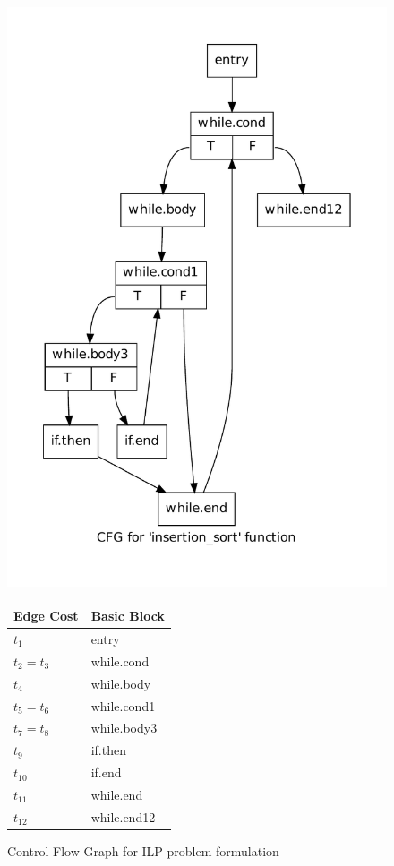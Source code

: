 \documentclass[12pt,a4paper,titlepage,oneside]{article}
\begin{document}
\begin{itemize}
\begin{figure}
\centering
\begin{minipage}[c]{.6\linewidth}
\centering
\includegraphics[width=0.90\linewidth]{../assignment/cfg_insertion_sort}
\end{minipage}%
\begin{minipage}[c]{.3\linewidth}
\centering
\small
\begin{tabular}{l|l}
\hline
Edge Cost & Basic Block \\
\hline
$t_1$ & entry \\
$t_2 = t_3$ & while.cond \\
$t_4$ & while.body \\
$t_5 = t_6$ & while.cond1 \\
$t_7 = t_8$ & while.body3 \\
$t_9$ & if.then \\
$t_{10}$ & if.end \\
$t_{11}$ & while.end \\
$t_{12}$ & while.end12 \\
\hline
\end{tabular}
\end{minipage}
\caption{Control-Flow Graph for ILP problem formulation}
\label{fig:ilp}
\end{figure}


\end{itemize}
\end{document}
